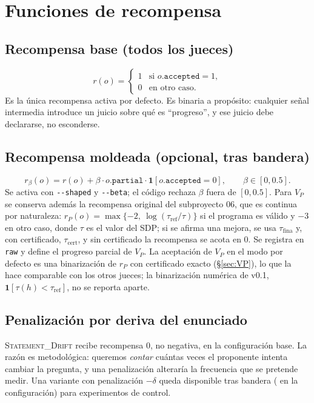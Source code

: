 \documentclass[11pt,a4paper]{article}
\theoremstyle{definition}
\theoremstyle{remark}
\newcommand{\lab}[1]{\textsc{#1}}
\newcommand{\id}[1]{\texttt{\detokenize{#1}}}
\begin{document}
\section{Funciones de recompensa}\label{sec:recompensa}

\subsection{Recompensa base (todos los jueces)}
\[
  r(o) = \begin{cases} 1 & \text{si } o.\texttt{accepted} = 1,\\ 0 & \text{en otro caso.}\end{cases}
\]
Es la única recompensa activa por defecto. Es binaria a propósito: cualquier señal intermedia introduce un juicio sobre qué es ``progreso'', y ese juicio debe declararse, no esconderse.

\subsection{Recompensa moldeada (opcional, tras bandera)}\label{sec:moldeada}
\[
  r_\beta(o) = r(o) + \beta \cdot o.\texttt{partial} \cdot \mathbf{1}[o.\texttt{accepted}=0],\qquad \beta \in [0, 0.5].
\]
Se activa con \texttt{-{}-shaped} y \texttt{-{}-beta}; el código rechaza $\beta$ fuera de $[0,0.5]$. Para $V_P$ se conserva además la recompensa original del subproyecto 06, que es continua por naturaleza: $r_P(o) = \max\{-2,\ \log(\tau_{\mathrm{ref}}/\tau)\}$ si el programa es válido y $-3$ en otro caso, donde $\tau$ es el valor del SDP; si se afirma una mejora, se usa $\tau_{\mathrm{fina}}$ y, con certificado, $\tau_{\mathrm{cert}}$, y sin certificado la recompensa se acota en $0$. Se registra en \texttt{raw} y define el progreso parcial de $V_P$. La aceptación de $V_P$ en el modo por defecto es una binarización de $r_P$ con certificado exacto (§\ref{sec:VP}), lo que la hace comparable con los otros jueces; la binarización numérica de v0.1, $\mathbf{1}[\tau(h) < \tau_{\mathrm{ref}}]$, no se reporta aparte.

\subsection{Penalización por deriva del enunciado}\label{sec:deriva}
\lab{Statement\_Drift} recibe recompensa $0$, no negativa, en la configuración base. La razón es metodológica: queremos \emph{contar} cuántas veces el proponente intenta cambiar la pregunta, y una penalización alteraría la frecuencia que se pretende medir. Una variante con penalización $-\delta$ queda disponible tras bandera (\id{drift_penalty} en la configuración) para experimentos de control.
\end{document}
